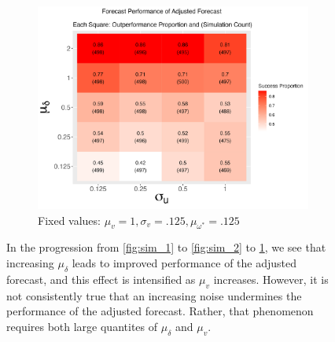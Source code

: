 \documentclass{uiucthesis2021}
\theoremstyle{definition}
\begin{document}
\begin{figure}[!h]
    \begin{subfigure}{.44\linewidth} 
      \centering
        \includegraphics[scale=.42]{simulation_plots/Aug28_224322_2024_mu[delta]_sigma[u].png}
        \caption{Fixed values: $\mu_{v} = 1, \sigma_{v} = .125, \mu_{\omega^{*}} = .125$}\label{fig:sim_3}
    \end{subfigure}
    
        \caption{In the progression from \ref{fig:sim_1} to \ref{fig:sim_2} to \ref{fig:sim_3}, we see that increasing $\mu_{\delta}$ leads to improved performance of the adjusted forecast, and this effect is intensified as $\mu_{v}$ increases.  However, it is not consistently true that an increasing noise undermines the performance of the adjusted forecast.  Rather, that phenomenon requires both large quantites of $\mu_{\delta}$ and $\mu_{v}$.}
        \label{fig:signoise}
      \end{figure}
\end{document}
